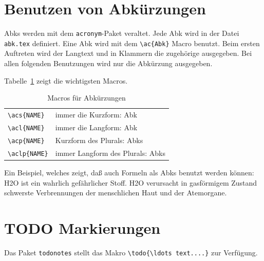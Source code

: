 
\section{Benutzen von Abkürzungen}

\acp{Abk} %
werden mit dem \verb+acronym+-Paket veraltet.
Jede
\ac{Abk} %
wird in der Datei \texttt{abk.tex} definiert.
Eine \ac{Abk} wird mit dem \verb+\ac{Abk}+ Macro benutzt. Beim ersten Auftreten
wird der Langtext und in Klammern die zugehörige  ausgegeben. Bei allen
folgenden Benutzungen wird nur die Abkürzung ausgegeben.

Tabelle~\ref{acronym-macros} zeigt die wichtigsten Macros.
\begin{table}[ht]
    \begin{center}
        \begin{tabular}{|ll|}
            \hline
            \verb+\acs{NAME}+ & immer die Kurzform: \acs{Abk}        \\
            \verb+\acl{NAME}+ & immer die Langform: \acl{Abk}        \\
            \verb+\acp{NAME}+ & Kurzform des Plurals: \acp{Abk}        \\
            \verb+\aclp{NAME}+ & immer Langform des Plurals: \aclp{Abk}    \\\hline
        \end{tabular}
    \end{center}
    \caption{\label{acronym-macros}Macros für Abkürzungen}
\end{table}

Ein Beispiel, welches zeigt, daß auch Formeln als \acp{Abk} benutzt werden können:\\
\ac{H2O} ist ein wahrlich gefährlicher Stoff. \ac{H2O} verursacht in gasförmigem
Zustand schwerste Verbrennungen der menschlichen Haut und der Atemorgane.


\section{TODO Markierungen}

Das Paket \texttt{todonotes} stellt das Makro
\verb+\todo{\ldots text....}+ zur Verfügung.

